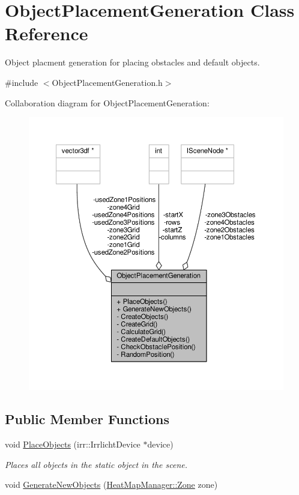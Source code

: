\hypertarget{class_object_placement_generation}{\section{Object\-Placement\-Generation Class Reference}
\label{class_object_placement_generation}
}


Object placment generation for placing obstacles and default objects.  




{\ttfamily \#include $<$Object\-Placement\-Generation.\-h$>$}



Collaboration diagram for Object\-Placement\-Generation\-:
\nopagebreak
\begin{figure}[H]
\begin{center}
\leavevmode
\includegraphics[width=350pt]{class_object_placement_generation__coll__graph}
\end{center}
\end{figure}
\subsection*{Public Member Functions}
\begin{DoxyCompactItemize}
\item 
void \hyperlink{class_object_placement_generation_a94bc6a7a4ea7001bff3799cd9da12481}{Place\-Objects} (irr\-::\-Irrlicht\-Device $\ast$device)
\begin{DoxyCompactList}\small\item\em Places all objects in the static object in the scene. \end{DoxyCompactList}\item 
void \hyperlink{class_object_placement_generation_aba7072b3fd4c0443ec7884b108b8847a}{Generate\-New\-Objects} (\hyperlink{class_heat_map_manager_a6d43bc39106e6d2e72437f8902a586b6}{Heat\-Map\-Manager\-::\-Zone} zone)
\end{DoxyCompactItemize}
